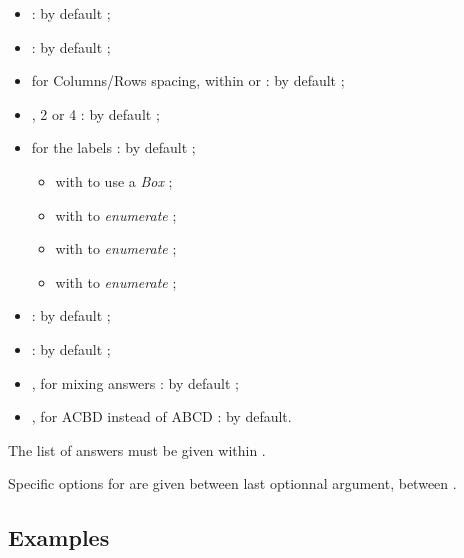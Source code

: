 \documentclass[english,11pt,a4paper]{article}
\begin{document}
\begin{itemize}
	\item {} :  by default ;
	\item {}  :  by default ;
	\item {} for Columns/Rows spacing, within  or  : \MontreCode{6pt/2pt} by default ;
	\item {}, 2 or 4 :  by default ;
	\item {} for the labels :  by default ;
	\begin{itemize}
		\item with  to use a \textit{Box} ;
		\item with  to \textit{enumerate}  ;
		\item with  to \textit{enumerate}  ;
		\item with  to \textit{enumerate}  ;
	\end{itemize}
	\item {} :  by default ;
	\item {} :  by default ;
	\item {}, for mixing answers :  by default ;
	\item {}, for ACBD instead of ABCD :  by default.
\end{itemize}

The list of answers must be given within .

Specific options for  are given between last optionnal argument, between .

\subsection{Examples}

\begin{demohigh}[language=latex/latex3,style/main=teal!25,style/code=teal!25]
\end{demohigh}

\begin{demohigh}[language=latex/latex3,style/main=teal!25,style/code=teal!25]


\end{demohigh}
\end{document}
